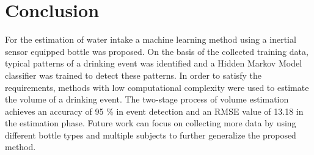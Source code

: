 \section{Conclusion}
For the estimation of water intake a machine learning method using a inertial sensor equipped bottle was proposed. On the basis of the collected training data, typical patterns of a drinking event was identified and a Hidden Markov Model classifier was trained to detect these patterns. In order to satisfy the requirements, methods with low computational complexity were used to estimate the volume of a drinking event. The two-stage process of volume estimation achieves an accuracy of 95 \% in event detection and an RMSE value of 13.18 in the estimation phase. Future work can focus on collecting more data by using different bottle types and multiple subjects to further generalize the proposed method.